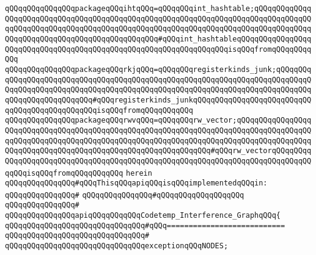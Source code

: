 \verb|qQQqqQQqqQQqqQQqpackageqQQqihtqQQq=qQQqqQQqint_hashtable;qQQqqQQqqQQqqQQqqQQqqQQqqQQqqQQqqQQqqQQqqQQqqQQqqQQqqQQqqQQqqQQqqQQqqQQqqQQqqQQqqQQqqQQqqQQqqQQqqQQqqQQqqQQqqQQqqQQqqQQqqQQqqQQqqQQqqQQqqQQqqQQqqQQqqQQqqQQqqQQqqQQqqQQqqQQqqQQqqQQqqQQqqQQq#qQQqint_hashtableqQQqqQQqqQQqqQQqqQQqqQQqqQQqqQQqqQQqqQQqqQQqqQQqqQQqqQQqqQQqqQQqqQQqisqQQqfromqQQqqQQqqQQq|\newline
\verb|qQQqqQQqqQQqqQQqpackageqQQqrkjqQQq=qQQqqQQqregisterkinds_junk;qQQqqQQqqQQqqQQqqQQqqQQqqQQqqQQqqQQqqQQqqQQqqQQqqQQqqQQqqQQqqQQqqQQqqQQqqQQqqQQqqQQqqQQqqQQqqQQqqQQqqQQqqQQqqQQqqQQqqQQqqQQqqQQqqQQqqQQqqQQqqQQqqQQqqQQqqQQqqQQqqQQqqQQq#qQQqregisterkinds_junkqQQqqQQqqQQqqQQqqQQqqQQqqQQqqQQqqQQqqQQqqQQqqQQqisqQQqfromqQQqqQQqqQQq|\newline
\verb|qQQqqQQqqQQqqQQqpackageqQQqrwvqQQq=qQQqqQQqrw_vector;qQQqqQQqqQQqqQQqqQQqqQQqqQQqqQQqqQQqqQQqqQQqqQQqqQQqqQQqqQQqqQQqqQQqqQQqqQQqqQQqqQQqqQQqqQQqqQQqqQQqqQQqqQQqqQQqqQQqqQQqqQQqqQQqqQQqqQQqqQQqqQQqqQQqqQQqqQQqqQQqqQQqqQQqqQQqqQQqqQQqqQQqqQQqqQQqqQQqqQQqqQQq#qQQqrw_vectorqQQqqQQqqQQqqQQqqQQqqQQqqQQqqQQqqQQqqQQqqQQqqQQqqQQqqQQqqQQqqQQqqQQqqQQqqQQqqQQqqQQqisqQQqfromqQQqqQQqqQQq|\newline
\verb|herein|\newline
\newline
\verb|qQQqqQQqqQQqqQQq#qQQqThisqQQqapiqQQqisqQQqimplementedqQQqin:|\newline
\verb|qQQqqQQqqQQqqQQq#|\newline
\verb|qQQqqQQqqQQqqQQq#qQQqqQQqqQQqqQQqqQQq|\newline
\verb|qQQqqQQqqQQqqQQq#|\newline
\verb|qQQqqQQqqQQqqQQqapiqQQqqQQqqQQqCodetemp_Interference_GraphqQQq{|\newline
\verb|qQQqqQQqqQQqqQQqqQQqqQQqqQQqqQQq#qQQq===========================|\newline
\verb|qQQqqQQqqQQqqQQqqQQqqQQqqQQqqQQq#|\newline
\newline
\newline
\verb|qQQqqQQqqQQqqQQqqQQqqQQqqQQqqQQqexceptionqQQqNODES;|\newline
